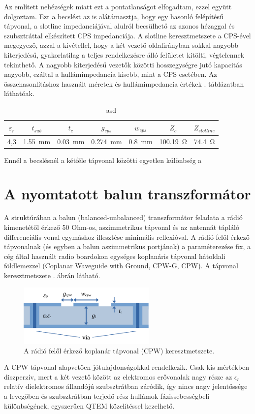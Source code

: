 \par Az említett nehézségek miatt ezt a pontatlanságot elfogadtam, ezzel együtt dolgoztam. Ezt a becslést az is alátámasztja, hogy egy hasonló felépítésű tápvonal, a slotline impedanciájával alulról becsülhető az azonos hézaggal és szubsztráttal elkészített CPS impedanciája. A slotline keresztmetszete a CPS-ével megegyező, azzal a kivétellel, hogy a két vezető oldalirányban sokkal nagyobb kiterjedésű, gyakorlatilag a teljes rendelkezésre álló felületet kitölti, végtelennek tekinthető. A nagyobb kiterjedésű vezetők közötti hosszegységre jutó kapacitás nagyobb, ezáltal a hullámimpedancia kisebb, mint a CPS esetében. Az összehasonlításhoz használt méretek és hullámimpedancia értékek . táblázatban láthatóak.
\begin{table}[h!]
	\centering
	\begin{tabular}{||c|c|c|c|c||c|c||}
	\hline
	$\varepsilon_r$ & $t_{sub}$ & $t_{c}$ & $g_{cps}$ & $w_{cps}$ & $Z_{c}$ & $Z_{slotline}$ \\ [0.5ex] 
	\hline\hline
	4,3 & \SI{1,55}{mm} & \SI{0,03}{mm} & \SI{0,274}{mm} & \SI{0,8}{mm} & \SI{100,19}{\ohm} & \SI{74,4}{\ohm}\\
	\hline
	\end{tabular}
	\caption{asd}
	\label{tab:slotline-cps}
\end{table}
Ennél a becslésnél a kétféle tápvonal közötti egyetlen különbség a 
\section{A nyomtatott balun transzformátor}
	A struktúrában a balun (balanced-unbalanced) transzformátor feladata a rádió kimenetétől érkező 50 Ohm-os, aszimmetrikus tápvonal és az antennát tápláló differenciális vonal egymáshoz illesztése minimális reflexióval. A rádió felől érkező tápvonalnak (és egyben a balun aszimmetrikus portjának) a paraméterezése fix, a cég által használt radio boardokon egységes koplanáris tápvonal hátoldali földlemezzel (Coplanar Waveguide with Ground, CPW-G, CPW). A tápvonal keresztmetszete . ábrán látható.
\begin{figure}[h]
	\centering
	\includegraphics[width=0.6\textwidth]{kep/cpw.pdf}
	\caption{A rádió felől érkező koplanár tápvonal (CPW) keresztmetszete.}
	\label{fig:cpw}
\end{figure}
	A CPW tápvonal alapvetően jótulajdonságokkal rendelkezik. Csak kis mértékben diszperzív, mert a két vezető között az elektromos erővonalak nagy része az $\epsilon_r$ relatív dielektromos állandójú szubsztrátban záródik, így nincs nagy jelentőssége a levegőben és szubsztrátban terjedő rész-hullámok fázissebességbeli különbségének, egyszerűen QTEM közelítéssel kezelhető.
